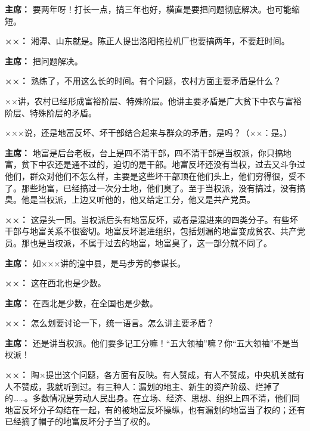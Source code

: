 \begin{list}{}
\item[\textbf{主席：}] 要两年呀！打长一点，搞三年也好，横直是要把问题彻底解决。也可能缩短。

\item[\textbf{××：}] 湘潭、山东就是。陈正人提出洛阳拖拉机厂也要搞两年，不要赶时间。

\item[\textbf{主席：}] 把问题解决。

\item[\textbf{××：}] 熟练了，不用这么长的时间。有个问题，农村方面主要矛盾是什么？

××讲，农村已经形成富裕阶层、特殊阶层。他讲主要矛盾是广大贫下中农与富裕阶层、特殊阶层的矛盾。

×××说，还是地富反坏、坏干部结合起来与群众的矛盾，是吗？（××：是。）

\item[\textbf{主席：}] 地富是后台老板，台上是四不清干部，四不清干部是当权派，你只搞地富，贫下中农还是通不过的，迫切的是干部。地富反坏还没有当权，过去又斗争过他们，群众对他们不怎么样，主要是这些坏干部顶在他们头上，他们穷得很，受不了。那些地富，已经搞过一次分土地，他们臭了。至于当权派，没有搞过，没有搞臭。他是当权派，上边又听他的，他又给定工分，他又是共产党员。

\item[\textbf{××：}] 这是头一同。当权派后头有地富反坏，或者是混进来的四类分子。有些坏干部与地富关系不很密切。地富反坏混进组织，包括划漏的地富变成贫农、共产党员。那也是当权派，不属于过去的地富，地富臭了，这一部分就不同了。

\item[\textbf{主席：}] 如×××讲的湟中县，是马步芳的参谋长。

\item[\textbf{××：}] 这在西北也是少数。

\item[\textbf{主席：}] 在西北是少数，在全国也是少数。

\item[\textbf{××：}] 怎么划要讨论一下，统一语言。怎么讲主要矛盾？

\item[\textbf{主席：}] 还是讲当权派。他们要多记工分嘛！“五大领袖”嘛？你“五大领袖”不是当权派！

\item[\textbf{××：}] 陶×提出这个问题，各方面有反映。有人赞成，有人不赞成，中央机关就有人不赞成，我就听到过。有三种人：漏划的地主、新生的资产阶级、烂掉了的……。多数情况是劳动人民出身。在立场、经济、思想、组织上四不清，他们同地富反坏分子勾结在一起，有的被地富反坏操纵，也有漏划的地富当了权的；还有已经摘了帽子的地富反坏分子当了权的。


\end{list}
